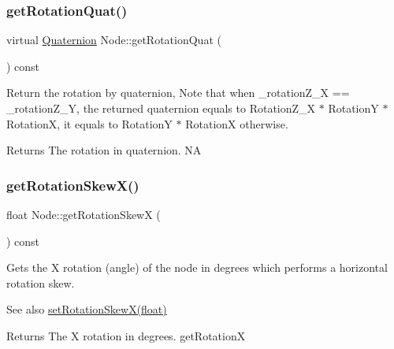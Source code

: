 \subsubsection{\texorpdfstring{get\+Rotation\+Quat()}{getRotationQuat()}\hspace{0.1cm}{\footnotesize\ttfamily [2/2]}}
{\footnotesize\ttfamily virtual \hyperlink{classQuaternion}{Quaternion} Node\+::get\+Rotation\+Quat (\begin{DoxyParamCaption}{ }\end{DoxyParamCaption}) const\hspace{0.3cm}{\ttfamily [virtual]}}

Return the rotation by quaternion, Note that when \+\_\+rotation\+Z\+\_\+X == \+\_\+rotation\+Z\+\_\+Y, the returned quaternion equals to Rotation\+Z\+\_\+X $\ast$ RotationY $\ast$ RotationX, it equals to RotationY $\ast$ RotationX otherwise.

\begin{DoxyReturn}{Returns}
The rotation in quaternion.  NA 
\end{DoxyReturn}
\mbox{\label{classNode_a2e23faa37bc1d55b7c4b6cba94a62fce}} 
\subsubsection{\texorpdfstring{get\+Rotation\+Skew\+X()}{getRotationSkewX()}\hspace{0.1cm}{\footnotesize\ttfamily [1/2]}}
{\footnotesize\ttfamily float Node\+::get\+Rotation\+SkewX (\begin{DoxyParamCaption}{ }\end{DoxyParamCaption}) const\hspace{0.3cm}{\ttfamily [virtual]}}

Gets the X rotation (angle) of the node in degrees which performs a horizontal rotation skew.

\begin{DoxySeeAlso}{See also}
{\ttfamily \hyperlink{classNode_a66a533225994dbfe125c3421df4cbb38}{set\+Rotation\+Skew\+X(float)}}
\end{DoxySeeAlso}
\begin{DoxyReturn}{Returns}
The X rotation in degrees.  get\+RotationX 
\end{DoxyReturn}
\mbox{\label{classNode_a1102a3896c8af0bd11d1cf9a8b89f4fa}} 
